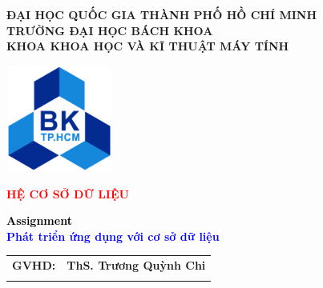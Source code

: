 \begin{titlepage}
	
	
\begin{center}  
\textbf{ĐẠI HỌC QUỐC GIA THÀNH PHỐ HỒ CHÍ MINH\\TRƯỜNG ĐẠI HỌC BÁCH KHOA\\KHOA KHOA HỌC VÀ KĨ THUẬT MÁY TÍNH}

\vspace{1cm}

\includegraphics[width=3.5cm,height=3.5cm]{images/LogoBK}

\vspace{1cm}

{\LARGE \textbf{\textcolor{red}{HỆ CƠ SỞ DỮ LIỆU}}}
\\

\vspace{0.5cm}

\begin{table}[h!]
	\centering
{\large \textbf{\textcolor{black}{Assignment}}}\\
\vspace{0.5cm}
{\LARGE \textbf{\textcolor{blue}{Phát triển ứng dụng với cơ sở dữ liệu}}}
\end{table}

\vspace{0.5cm}

\begin{tabular}{ll}
		\multicolumn{1}{r}{\textbf{GVHD:}} 
		& \textbf{ThS. Trương Quỳnh Chi}\\
		& \\
		

\end{tabular}
\end{center}
\end{titlepage}
